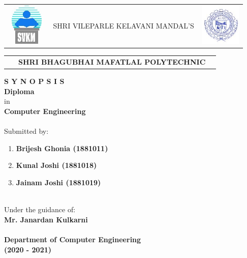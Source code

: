 \begin{titlepage}
	\begin{center}
		\begin{table}[h]
			\begin{tabular}{lll}
				\includegraphics[width=2cm,height=2cm]{media/svkm.jpeg}
				& \large{SHRI VILEPARLE KELAVANI MANDAL'S} &
				\includegraphics[width=2cm,height=2cm]{media/sbmp.jpeg}
				\\
			\end{tabular}
			\begin{tabular}{lll}
				\ & \Large \textbf {SHRI BHAGUBHAI MAFATLAL POLYTECHNIC}
			\end{tabular}
		\end{table}
	\Large \textbf {S Y N O P S I S} 
	\\
	\large \textbf {Diploma} \\
	in \\
	\large \textbf {Computer Engineering}
	\\ \ \\
	\large {Submitted by:} \\
	\begin{enumerate}
		\centering
		\item \textbf {Brijesh Ghonia (1881011)}
		\item \textbf {Kunal Joshi (1881018)}
		\item \textbf {Jainam Joshi (1881019)}
	\end{enumerate} \ \\
	{Under the guidance of:} \\
	\textbf {Mr. Janardan Kulkarni}
	\\ \ \\
	\Large \textbf {Department of Computer Engineering} \\
	\textbf {(2020 - 2021)}
	\end{center}
\end{titlepage}